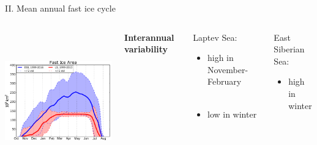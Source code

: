 \documentclass[8pt]{beamer}
\begin{document}
\setwatermark{\fontsize{125pt}{125pt}\selectfont{}}
\begin{frame}[fragile]{II. Mean annual fast ice cycle}
	\begin{columns}
			\begin{center}
				\includegraphics[height=6cm]{./img/Mean_SeasonalCycle_ESSvsSELS.pdf}\\
			\end{center}
			\begin{center}
				\textbf{Interannual variability}\\~\\
			\end{center}
				\begin{block}{\centering Laptev Sea:}
							
				\begin{itemize}
					\item high in November-February\\~\\
					\item low in winter
			\end{itemize}
			\end{block}
			
				\begin{block}{\centering East Siberian Sea:}
				\begin{itemize}
					\item high in winter
				\end{itemize}
			\end{block}
	\end{columns}
	
\end{frame}
\end{document}

